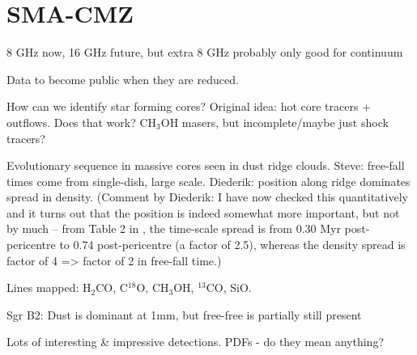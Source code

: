 \section{SMA-CMZ}
8 GHz now, 16 GHz future, but extra 8 GHz probably only good for continuum

Data to become public when they are reduced.

How can we identify star forming cores?  Original idea: hot core tracers + outflows.  Does that work? CH$_3$OH masers, but incomplete/maybe just shock tracers?

Evolutionary sequence in massive cores seen in dust ridge clouds.  Steve: free-fall times come from single-dish, large scale.  Diederik: position along ridge dominates spread in density. (Comment by Diederik: I have now checked this quantitatively and it turns out that the position is indeed somewhat more important, but not by much -- from Table 2 in \citet{Kruijssen2015a}, the time-scale spread is from 0.30 Myr post-pericentre to 0.74 post-pericentre (a factor of 2.5), whereas the density spread is factor of 4 => factor of 2 in free-fall time.)

Lines mapped: H$_2$CO, C$^{18}$O, CH$_3$OH, $^{13}$CO, SiO.

Sgr B2: Dust is dominant at 1mm, but free-free is partially still present

Lots of interesting & impressive detections.  PDFs - do they mean anything?